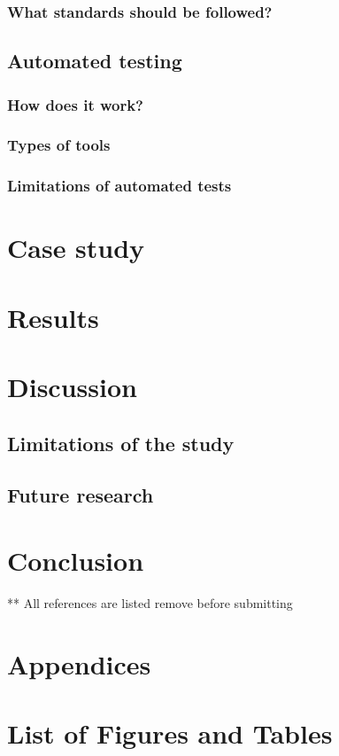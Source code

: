 \documentclass{master_thesis}
\begin{document}
		\subsubsection{What standards should be followed?}
	\subsection{Automated testing}
		\subsubsection{How does it work?}
		\subsubsection{Types of tools}
		\subsubsection{Limitations of automated tests}

\section{Case study}
\citep{byrne-harber2021}


\section{Results}
\section{Discussion}
	\subsection{Limitations of the study}
	\subsection{Future research}
\section*{Conclusion}


\printbibliography
** All references are listed remove before submitting
\section*{Appendices}
\section*{List of Figures and Tables}

\end{document}
